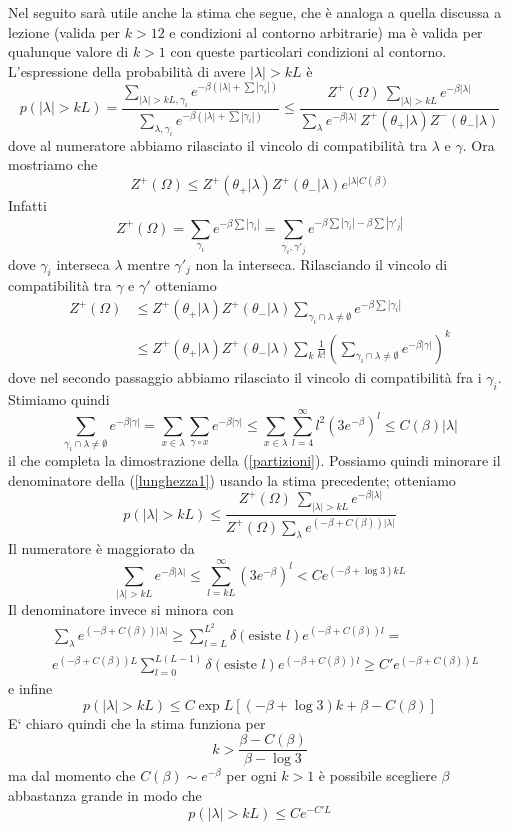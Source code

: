 \documentclass[aps,pre]{revtex4}
\newcommand{\beq}{\begin{equation}}
\newcommand{\eeq}{\end{equation}}
\begin{document}
\noindent
Nel seguito sar\`a utile anche la stima che segue, che \`e analoga a quella discussa a lezione (valida per $k > 12$ e condizioni al contorno arbitrarie) ma \`e valida per qualunque valore di $k>1$ con queste particolari condizioni al contorno. L'espressione della probabilit\`a di avere $|\lambda| > kL$ \`e
\beq
\label{lunghezza1}
p(|\lambda|>kL) = \frac{\sum_{|\lambda|>kL,\gamma_i} e^{-\beta(|\lambda|+\sum |\gamma_i|) }}{ \sum_{\lambda,\gamma_i} e^{-\beta(|\lambda|+\sum |\gamma_i|) }}
 \leq \frac{ Z^+(\Omega) \ \sum_{ |\lambda|>kL}e^{-\beta |\lambda|} }{ \sum_{\lambda} e^{-\beta |\lambda|} \ Z^+(\theta_+|\lambda) Z^-(\theta_-|\lambda) }
\eeq
dove al numeratore abbiamo rilasciato il vincolo di compatibilit\`a tra $\lambda$ e $\gamma$. Ora mostriamo che
\beq
\label{partizioni}
Z^+(\Omega) \leq Z^+(\theta_+|\lambda) Z^+(\theta_-|\lambda) e^{|\lambda| C(\beta)}
\eeq
Infatti
\beq
Z^+(\Omega) = \sum_{\gamma_i} e^{-\beta \sum |\gamma_i|} = \sum_{\gamma_i,\gamma'_j}  e^{-\beta \sum |\gamma_i| - \beta \sum |\gamma'_j| }
\eeq
dove $\gamma_i$ interseca $\lambda$ mentre $\gamma'_j$ non la interseca. Rilasciando il vincolo di compatibilit\`a tra $\gamma$ e $\gamma'$ otteniamo
\beq
\begin{split}
Z^+(\Omega) &\leq  Z^+(\theta_+|\lambda) Z^+(\theta_-|\lambda) \sum_{\gamma_i \cap \lambda \neq \emptyset} e^{-\beta \sum |\gamma_i|} \\
& \leq  Z^+(\theta_+|\lambda) Z^+(\theta_-|\lambda)  \sum_k \frac{1}{k!} \left( \sum_{\gamma_i \cap \lambda \neq \emptyset} e^{-\beta |\gamma|} \right)^k
\end{split}
\eeq
dove nel secondo passaggio abbiamo rilasciato il vincolo di compatibilit\`a fra i $\gamma_i$.
Stimiamo quindi
\beq
\sum_{\gamma_i \cap \lambda \neq \emptyset } e^{-\beta |\gamma|} = \sum_{x \in \lambda} \sum_{\gamma \circ x} e^{-\beta |\gamma|} \leq \sum_{x \in \lambda} \sum_{l=4}^\infty l^2 (3e^{-\beta})^l \leq C(\beta) |\lambda|
\eeq
il che completa la dimostrazione della (\ref{partizioni}). Possiamo quindi minorare il denominatore della (\ref{lunghezza1}) usando la stima precedente; otteniamo
\beq
p(|\lambda|>kL)  \leq \frac{ Z^+(\Omega) \ \sum_{ |\lambda|>kL}e^{-\beta |\lambda|} }{ Z^+(\Omega) \sum_{\lambda} e^{ (-\beta + C(\beta)) |\lambda|} }
\eeq
Il numeratore \`e maggiorato da
\beq
 \sum_{ |\lambda|>kL}e^{-\beta |\lambda|} \leq \sum_{l=kL}^\infty (3e^{-\beta})^l < C e^{(-\beta + \log 3)kL}
\eeq
Il denominatore invece si minora con
\beq
\begin{split}
&\sum_{\lambda} e^{ (-\beta + C(\beta)) |\lambda|} \geq \sum_{l=L}^{L^2} \delta( \text{esiste } l) e^{ (-\beta + C(\beta))  l} = \\ &e^{ (-\beta + C(\beta))  L} \sum_{l=0}^{L(L-1)}  \delta( \text{esiste } l) e^{ (-\beta + C(\beta))  l} \geq C'  e^{ (-\beta + C(\beta))  L}
\end{split}
\eeq
e infine
\beq
p(|\lambda|>kL)  \leq C \exp L \left[ (-\beta + \log 3)k + \beta - C(\beta) \right]
\eeq
E` chiaro quindi che la stima funziona per
\beq
k > \frac{\beta - C(\beta)}{\beta - \log 3}
\eeq
ma dal momento che $C(\beta) \sim e^{-\beta}$ per ogni $k>1$ \`e possibile scegliere $\beta$ abbastanza grande in modo che
\beq
\label{lunghezza2}
p(|\lambda|>kL)  \leq C e^{-C' L}
\eeq
\end{document}
